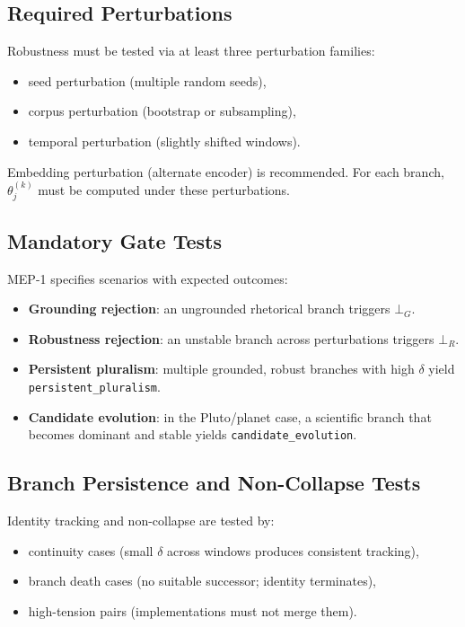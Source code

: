 \documentclass[11pt, a4paper]{article}
\begin{document}
\subsection{Required Perturbations}

Robustness must be tested via at least three perturbation families:
\begin{itemize}[nosep]
  \item seed perturbation (multiple random seeds),
  \item corpus perturbation (bootstrap or subsampling),
  \item temporal perturbation (slightly shifted windows).
\end{itemize}
Embedding perturbation (alternate encoder) is recommended.
For each branch, $\theta_j^{(k)}$ must be computed under these perturbations.

\subsection{Mandatory Gate Tests}

MEP-1 specifies scenarios with expected outcomes:
\begin{itemize}[nosep]
  \item \textbf{Grounding rejection}: an ungrounded rhetorical branch triggers $\bot_G$.
  \item \textbf{Robustness rejection}: an unstable branch across perturbations triggers $\bot_R$.
  \item \textbf{Persistent pluralism}: multiple grounded, robust branches with high $\delta$ yield \texttt{persistent\_pluralism}.
  \item \textbf{Candidate evolution}: in the Pluto/planet case, a scientific branch that becomes dominant and stable yields \texttt{candidate\_evolution}.
\end{itemize}

\subsection{Branch Persistence and Non-Collapse Tests}

Identity tracking and non-collapse are tested by:
\begin{itemize}[nosep]
  \item continuity cases (small $\delta$ across windows produces consistent tracking),
  \item branch death cases (no suitable successor; identity terminates),
  \item high-tension pairs (implementations must not merge them).
\end{itemize}
\end{document}
